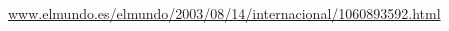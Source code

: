 \begin{thebibliography}{9}

  \url{www.elmundo.es/elmundo/2003/08/14/internacional/1060893592.html}

\end{thebibliography}